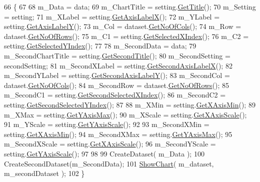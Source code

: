 \begin{DoxyCode}
66                                          \{
67 
68         m\_Data = data;
69         m\_ChartTitle = setting.\hyperlink{class_data_attribute_ade9747a192ba22fe1020e874bff6a48c}{GetTitle}();
70         m\_Setting = setting;
71         m\_XLabel = setting.\hyperlink{class_data_attribute_aecb451704a87d77dd80dbad8a19099d1}{GetAxisLabelX}();
72         m\_YLabel = setting.\hyperlink{class_data_attribute_af5f68794cd0195d42135d5e48120ccc0}{GetAxisLabelY}();
73         m\_Col = dataset.\hyperlink{class_dataset_ab922bef50c8aa1531de8704731779246}{GetNoOfCols}();
74         m\_Row = dataset.\hyperlink{class_dataset_a91257a605317576e87e1c32e54739e51}{GetNoOfRows}();
75         m\_C1 = setting.\hyperlink{class_data_attribute_a0f4a54973bc44b0526f78bda945dc81b}{GetSelectedXIndex}();
76         m\_C2 = setting.\hyperlink{class_data_attribute_a82e7519853d9f470ea183dd0c39a03d6}{GetSelectedYIndex}();
77         
78         m\_SecondData = data;
79         m\_SecondChartTitle = setting.\hyperlink{class_data_attribute_a4079522c93025fce7569eaed585f4aeb}{GetSecondTitle}();
80         m\_SecondSetting = secondSetting;
81         m\_SecondXLabel = setting.\hyperlink{class_data_attribute_a8ace4cb1fee9e2abeabe3efc9a190c8f}{GetSecondAxisLabelX}();
82         m\_SecondYLabel = setting.\hyperlink{class_data_attribute_a6efb7e067317898feefbbf6bd472b998}{GetSecondAxisLabelY}();
83         m\_SecondCol = dataset.\hyperlink{class_dataset_ab922bef50c8aa1531de8704731779246}{GetNoOfCols}();
84         m\_SecondRow = dataset.\hyperlink{class_dataset_a91257a605317576e87e1c32e54739e51}{GetNoOfRows}();
85         m\_SecondC1 = setting.\hyperlink{class_data_attribute_a7f501790eee650ddf9ac17c4f63a3995}{GetSecondSelectedXIndex}();
86         m\_SecondC2 = setting.\hyperlink{class_data_attribute_a6f61ad05915f4aa31ad3dba00596da64}{GetSecondSelectedYIndex}();
87         
88         m\_XMin = setting.\hyperlink{class_data_attribute_afa9da883abc4abad5f64c045de114c50}{GetXAxisMin}();
89         m\_XMax = setting.\hyperlink{class_data_attribute_a81243eb8f7008e05e74b0f3571d2f08d}{GetYAxisMax}();
90         m\_XScale = setting.\hyperlink{class_data_attribute_a5a1de25600487aa958a19ce01151fea4}{GetXAxisScale}();
91         m\_YScale = setting.\hyperlink{class_data_attribute_a95259727ce91efc0e0eaa28487d944c5}{GetYAxisScale}();
92         
93         m\_SecondXMin = setting.\hyperlink{class_data_attribute_afa9da883abc4abad5f64c045de114c50}{GetXAxisMin}();
94         m\_SecondXMax = setting.\hyperlink{class_data_attribute_a81243eb8f7008e05e74b0f3571d2f08d}{GetYAxisMax}();
95         m\_SecondXScale = setting.\hyperlink{class_data_attribute_a5a1de25600487aa958a19ce01151fea4}{GetXAxisScale}();
96         m\_SecondYScale = setting.\hyperlink{class_data_attribute_a95259727ce91efc0e0eaa28487d944c5}{GetYAxisScale}();
97         
98 
99         CreateDataset( m\_Data );
100         CreateSecondDataset(m\_SecondData);
101         \hyperlink{class_pie_chart_aa9e53463d5ff3f5326fb92b25c89f349}{ShowChart}( m\_dataset, m\_secondDataset );       
102     \}
\end{DoxyCode}
